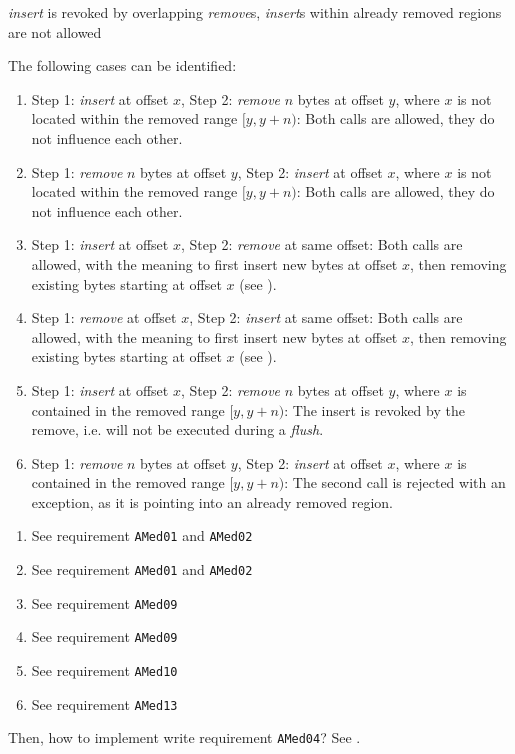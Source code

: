 {%
\emph{insert} is revoked by overlapping \emph{remove}s, \emph{insert}s within already removed regions are not allowed
}
{%
The following cases can be identified:
\begin{enumerate}
\item Step 1: \emph{insert} at offset $x$, Step 2: \emph{remove} $n$ bytes at offset $y$, where $x$ is not located within the removed range $[y,y+n)$: Both calls are allowed, they do not influence each other.
\item Step 1: \emph{remove} $n$ bytes at offset $y$, Step 2: \emph{insert} at offset $x$, where $x$ is not located within the removed range $[y,y+n)$: Both calls are allowed, they do not influence each other.
\item Step 1: \emph{insert} at offset $x$, Step 2: \emph{remove} at same offset: Both calls are allowed, with the meaning to first insert new bytes at offset $x$, then removing existing bytes starting at offset $x$ (see ).
\item Step 1: \emph{remove} at offset $x$, Step 2: \emph{insert} at same offset: Both calls are allowed, with the meaning to first insert new bytes at offset $x$, then removing existing bytes starting at offset $x$ (see ).
\item Step 1: \emph{insert} at offset $x$, Step 2: \emph{remove} $n$ bytes at offset $y$, where $x$ is contained in the removed range $[y,y+n)$: The insert is revoked by the remove, i.e. will not be executed during a \emph{flush}.
\item Step 1: \emph{remove} $n$ bytes at offset $y$, Step 2: \emph{insert} at offset $x$, where $x$ is contained in the removed range $[y,y+n)$: The second call is rejected with an exception, as it is pointing into an already removed region.
\end{enumerate}
}
{%
\begin{enumerate}
\item See requirement \texttt{AMed01} and \texttt{AMed02}
\item See requirement \texttt{AMed01} and \texttt{AMed02}
\item See requirement \texttt{AMed09}
\item See requirement \texttt{AMed09}
\item See requirement \texttt{AMed10}
\item See requirement \texttt{AMed13}
\end{enumerate}
}
{%
Then, how to implement write requirement \texttt{AMed04}? See .
}

